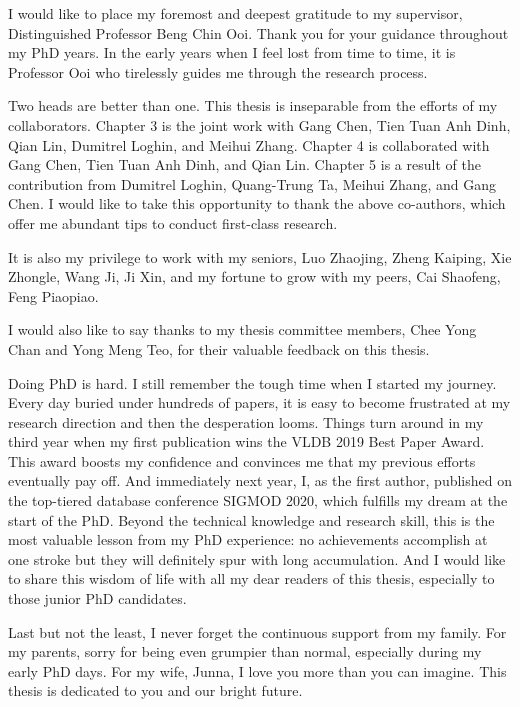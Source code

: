 \begin{acknowledgments}

I would like to place my foremost and deepest gratitude to my supervisor, Distinguished Professor Beng Chin Ooi. 
Thank you for your guidance throughout my PhD years. 
In the early years when I feel lost from time to time, it is Professor Ooi who tirelessly guides me through the research process. 

Two heads are better than one. This thesis is inseparable from the efforts of my collaborators. 
Chapter 3 is the joint work with Gang Chen, Tien Tuan Anh Dinh, Qian Lin, Dumitrel Loghin, and Meihui Zhang. 
Chapter 4 is collaborated with Gang Chen, Tien Tuan Anh Dinh, and Qian Lin. 
Chapter 5 is a result of the contribution from Dumitrel Loghin, Quang-Trung Ta, Meihui Zhang, and Gang Chen.
I would like to take this opportunity to thank the above co-authors, which offer me abundant tips to conduct first-class research. 

It is also my privilege to work with my seniors, Luo Zhaojing, Zheng Kaiping, Xie Zhongle, Wang Ji, Ji Xin, and my fortune to grow with my peers, Cai Shaofeng, Feng Piaopiao. 

I would also like to say thanks to my thesis committee members, Chee Yong Chan and Yong Meng Teo, for their valuable feedback on this thesis. 

Doing PhD is hard. I still remember the tough time when I started my journey. Every day buried under hundreds of papers, it is easy to become frustrated at my research direction and then the desperation looms. 
Things turn around in my third year when my first publication wins the VLDB 2019 Best Paper Award. This award boosts my confidence and convinces me that my previous efforts eventually pay off. 
And immediately next year, I, as the first author, published on the top-tiered database conference SIGMOD 2020, which fulfills my dream at the start of the PhD. 
Beyond the technical knowledge and research skill, this is the most valuable lesson from my PhD experience: no achievements accomplish at one stroke but they will definitely spur with long accumulation.  
And I would like to share this wisdom of life with all my dear readers of this thesis, especially to those junior PhD candidates. 

Last but not the least, I never forget the continuous support from my family. For my parents, sorry for being even grumpier than normal, especially during my early PhD days. For my wife, Junna, I love you more than you can imagine. This thesis is dedicated to you and our bright future. 
    

\end{acknowledgments}
